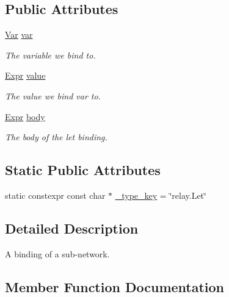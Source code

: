 \subsection*{Public Attributes}
\begin{DoxyCompactItemize}
\item 
\hyperlink{classtvm_1_1relay_1_1Var}{Var} \hyperlink{classtvm_1_1relay_1_1LetNode_a3a841faeeb71a7e59f99feffb182a7c1}{var}
\begin{DoxyCompactList}\small\item\em The variable we bind to. \end{DoxyCompactList}\item 
\hyperlink{namespacetvm_1_1relay_a5b84e3790f89bb3fad5c7911eeb99531}{Expr} \hyperlink{classtvm_1_1relay_1_1LetNode_aeb6d0020580face17b79cbaf0467203c}{value}
\begin{DoxyCompactList}\small\item\em The value we bind var to. \end{DoxyCompactList}\item 
\hyperlink{namespacetvm_1_1relay_a5b84e3790f89bb3fad5c7911eeb99531}{Expr} \hyperlink{classtvm_1_1relay_1_1LetNode_ab9446c69397941ecc0d8d348d9da240c}{body}
\begin{DoxyCompactList}\small\item\em The body of the let binding. \end{DoxyCompactList}\end{DoxyCompactItemize}
\subsection*{Static Public Attributes}
\begin{DoxyCompactItemize}
\item 
static constexpr const char $\ast$ \hyperlink{classtvm_1_1relay_1_1LetNode_a2e8f3b3e9b5f6e3d09eff0000067b29a}{\+\_\+type\+\_\+key} = \char`\"{}relay.\+Let\char`\"{}
\end{DoxyCompactItemize}


\subsection{Detailed Description}
A binding of a sub-\/network. 

\subsection{Member Function Documentation}
